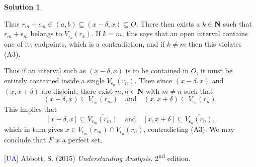 \documentclass[12pt]{article}
\theoremstyle{definition}
\theoremstyle{exercise}
\theoremstyle{solution}
\newtheorem*{solution}{Solution}
\newcommand{\ts}{\textsuperscript}
\newcommand{\quand}{\quad \text{and} \quad}
\newcommand{\N}{\mathbf{N}}
\begin{document}
\begin{solution}
\begin{enumerate}
        Thus \( r_m + \epsilon_m \in (a, b) \subseteq (x - \delta, x) \subseteq O \). There then exists a \( k \in \N \) such that \( r_m + \epsilon_m \) belongs to \( V_{\epsilon_k}(r_k) \). If \( k = m \), this says that an open interval contains one of its endpoints, which is a contradiction, and if \( k \neq m \) then this violates (A3).

        Thus if an interval such as \( (x - \delta, x) \) is to be contained in \( O \), it must be entirely contained inside a single \( V_{\epsilon_n}(r_n) \). Then since \( (x - \delta, x) \) and \( (x, x + \delta) \) are disjoint, there exist \( m, n \in \N \) with \( m \neq n \) such that
        \[
            (x - \delta, x) \subseteq V_{\epsilon_m}(r_m) \quand (x, x + \delta) \subseteq V_{\epsilon_n}(r_n).
        \]
        This implies that
        \[
            [x - \delta, x] \subseteq \overline{V_{\epsilon_m}(r_m)} \quand [x, x + \delta] \subseteq \overline{V_{\epsilon_n}(r_n)},
        \]
        which in turn gives \( x \in \overline{V_{\epsilon_m}(r_m)} \cap \overline{V_{\epsilon_n}(r_n)} \), contradicting (A3). We may conclude that \( F \) is a perfect set.
    \end{enumerate}
\end{solution}

\noindent \hrulefill

\noindent \hypertarget{ua}{\textcolor{blue}{[UA]} Abbott, S. (2015) \textit{Understanding Analysis.} 2\ts{nd} edition.}
\end{document}
